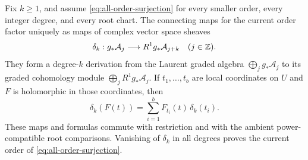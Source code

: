 \begin{lemma}\label{lem:obstruction-derivation}
Fix \(k\geq1\), and assume \eqref{eq:all-order-surjection} for every
smaller order, every integer degree, and every root chart.  The connecting
maps for the current order factor uniquely as maps of complex vector
space sheaves
\begin{equation}\label{eq:obstruction-map}
 \delta_k:g_*\mathcal A_j\longrightarrow R^1g_*\mathcal A_{j+k}
 \quad(j\in\mathbb Z).
\end{equation}
They form a degree-\(k\) derivation from the Laurent graded algebra
\(\bigoplus_jg_*\mathcal A_j\) to its graded cohomology module
\(\bigoplus_jR^1g_*\mathcal A_j\).  If \(t_1,\ldots,t_b\) are local
coordinates on \(U\) and \(F\) is holomorphic in those coordinates, then
\begin{equation}\label{eq:obstruction-chain-rule}
 \delta_k(F(t))=\sum_{i=1}^b F_{t_i}(t)\,\delta_k(t_i).
\end{equation}
These maps and formulas commute with restriction and with the ambient
power-compatible root comparisons.  Vanishing of \(\delta_k\) in all
degrees proves the current order of \eqref{eq:all-order-surjection}.
\end{lemma}
